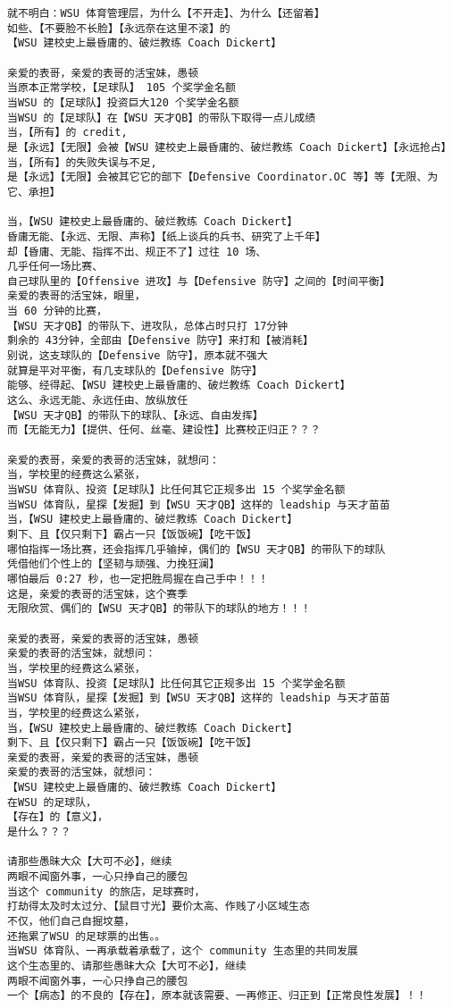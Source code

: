 \documentclass[9pt, b5paper]{article}
\begin{document}
\begin{verbatim}
就不明白：WSU 体育管理层，为什么【不开走】、为什么【还留着】
如些、【不要脸不长脸】【永远奈在这里不滚】的
【WSU 建校史上最昏庸的、破烂教练 Coach Dickert】

亲爱的表哥，亲爱的表哥的活宝妹，愚顿
当原本正常学校，【足球队】 105 个奖学金名额
当WSU 的【足球队】投资巨大120 个奖学金名额
当WSU 的【足球队】在【WSU 天才QB】的带队下取得一点儿成绩
当，【所有】的 credit,
是【永远】【无限】会被【WSU 建校史上最昏庸的、破烂教练 Coach Dickert】【永远抢占】
当，【所有】的失败失误与不足,
是【永远】【无限】会被其它它的部下【Defensive Coordinator.OC 等】等【无限、为它、承担】

当，【WSU 建校史上最昏庸的、破烂教练 Coach Dickert】
昏庸无能、【永远、无限、声称】【纸上谈兵的兵书、研究了上千年】
却【昏庸、无能、指挥不出、规正不了】过往 10 场、
几乎任何一场比赛、
自己球队里的【Offensive 进攻】与【Defensive 防守】之间的【时间平衡】
亲爱的表哥的活宝妹，眼里，
当 60 分钟的比赛，
【WSU 天才QB】的带队下、进攻队，总体占时只打 17分钟
剩余的 43分钟，全部由【Defensive 防守】来打和【被消耗】
别说，这支球队的【Defensive 防守】，原本就不强大
就算是平对平衡，有几支球队的【Defensive 防守】
能够、经得起、【WSU 建校史上最昏庸的、破烂教练 Coach Dickert】
这么、永远无能、永远任由、放纵放任
【WSU 天才QB】的带队下的球队、【永远、自由发挥】
而【无能无力】【提供、任何、丝毫、建设性】比赛校正归正？？？

亲爱的表哥，亲爱的表哥的活宝妹，就想问：
当，学校里的经费这么紧张，
当WSU 体育队、投资【足球队】比任何其它正规多出 15 个奖学金名额
当WSU 体育队，星探【发掘】到【WSU 天才QB】这样的 leadship 与天才苗苗
当，【WSU 建校史上最昏庸的、破烂教练 Coach Dickert】
剩下、且【仅只剩下】霸占一只【饭饭碗】【吃干饭】
哪怕指挥一场比赛，还会指挥几乎输掉，偶们的【WSU 天才QB】的带队下的球队
凭借他们个性上的【坚韧与顽强、力挽狂澜】
哪怕最后 0:27 秒，也一定把胜局握在自己手中！！！
这是，亲爱的表哥的活宝妹，这个赛季
无限欣赏、偶们的【WSU 天才QB】的带队下的球队的地方！！！

亲爱的表哥，亲爱的表哥的活宝妹，愚顿
亲爱的表哥的活宝妹，就想问：
当，学校里的经费这么紧张，
当WSU 体育队、投资【足球队】比任何其它正规多出 15 个奖学金名额
当WSU 体育队，星探【发掘】到【WSU 天才QB】这样的 leadship 与天才苗苗
当，学校里的经费这么紧张，
当，【WSU 建校史上最昏庸的、破烂教练 Coach Dickert】
剩下、且【仅只剩下】霸占一只【饭饭碗】【吃干饭】
亲爱的表哥，亲爱的表哥的活宝妹，愚顿
亲爱的表哥的活宝妹，就想问：
【WSU 建校史上最昏庸的、破烂教练 Coach Dickert】
在WSU 的足球队，
【存在】的【意义】，
是什么？？？

请那些愚昧大众【大可不必】，继续
两眼不闻窗外事，一心只挣自己的腰包
当这个 community 的旅店，足球赛时，
打劫得太及时太过分、【鼠目寸光】要价太高、作贱了小区域生态
不仅，他们自己自掘坟墓，
还拖累了WSU 的足球票的出售。。
当WSU 体育队、一再承载着承载了，这个 community 生态里的共同发展
这个生态里的、请那些愚昧大众【大可不必】，继续
两眼不闻窗外事，一心只挣自己的腰包
一个【病态】的不良的【存在】，原本就该需要、一再修正、归正到【正常良性发展】！！


\end{verbatim}
\end{document}
